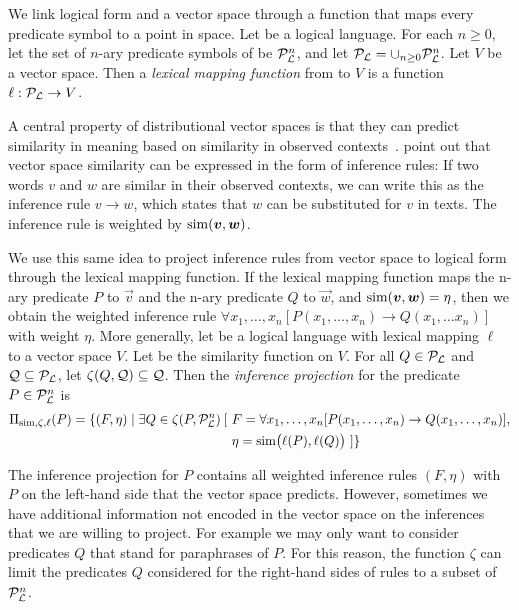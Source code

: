We link logical form and a vector space through a function that maps every predicate symbol to a point in
space. Let \loglang be a logical language. For each $n \ge
0$, let the set of $n$-ary predicate symbols of \loglang be
${\cal{P}}_{{\cal{L}}}^n$, and let ${\cal{P}}_{{\cal{L}}} = \cup_{n \ge 0}
{\cal{P}}_{{\cal{L}}}^n$. Let $V$ be a vector space. Then a \emph{lexical
  mapping function}
from \loglang to $V$ is a function $\ell:
{\cal{P}}_{{\cal{L}}} \to V$.

A central property
of distributional vector spaces is that they can predict similarity in
meaning based on similarity in observed
contexts~\citep{Harris}. \citet{LinPantel:01} point out that
vector space similarity can be expressed in the form of 
inference rules: If two words $v$
and $w$ are similar in their observed contexts, we can write this as
the inference rule $v \to w$, which states that $w$ can be substituted
for $v$ in texts. The inference rule is weighted by $\simfunc(\vec v, \vec w)$. 

We use this same idea to project inference rules from vector space to
logical form through the lexical mapping function. If the lexical mapping
function maps the n-ary predicate $P$ to $\vec
v$ and the n-ary predicate $Q$ to $ \vec w$, and $\simfunc(\vec v, \vec w) = \eta$, then
we obtain the weighted inference rule $\forall x_1,
\ldots, x_n[ P(x_1, \ldots, x_n) \to Q(x_1, \ldots x_n) ]$ with weight
$\eta$. More generally, let \loglang
be a logical language with lexical mapping $\ell$ to a vector space 
$V$. Let \simfunc{} be the similarity function on $V$. For all $Q \in
{\cal{P}}_{{\cal{L}}}$ and ${\cal Q} \subseteq {\cal{P}}_{{\cal{L}}}$, let
$\zeta(Q, {\cal Q}) \subseteq {\cal Q}$. Then the \emph{inference
  projection} for the predicate $P \in {\cal{P}}_{{\cal{L}}}^n$ is 
\begin{align*}
\Pi_{\mathrm{sim}, \zeta, \ell}(P) = \{ (F, \eta) \mid \exists Q \in \zeta(P, {\cal{P}}_{{\cal{L}}}^n)\:[ 
&~F = \forall x_1, \ldots, x_n[P(x_1, \ldots, x_n) \to Q(x_1, \ldots, x_n)], \\
&~\eta = \mathrm{sim}\big(\ell(P), \ell(Q)\big) ~] \}
\end{align*}

The inference projection for $P$ contains all weighted inference rules
$(F, \eta)$ with $P$ on the left-hand side that the vector space
predicts. However, sometimes we have additional information not
encoded in the vector space on the inferences that we are
willing to project. For example we may only want to consider
predicates $Q$ that stand for paraphrases of $P$. For this reason, the
function $\zeta$ can limit the predicates $Q$ considered for the right-hand
sides of rules to a subset of ${\cal{P}}_{{\cal{L}}}^n$. 


